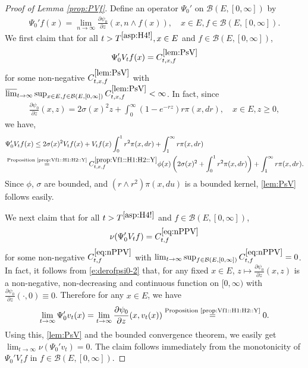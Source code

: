 \documentclass[12pt,a4paper]{amsart}
\numberwithin{equation}{section}
\theoremstyle{plain}
\theoremstyle{definition}
\theoremstyle{remark}
\begin{document}
\begin{proof}[Proof of Lemma \ref{prop:PVf}]
	Define an operator $\Psi_0'$ on $\mathcal B(E,[0,\infty])$ by
	\begin{align}
	\Psi_0' f(x)
	= \lim_{n\to \infty}\frac{\partial \psi_0}{ \partial z} (x, n\wedge f(x)),
	\quad x\in E, f\in \mathcal B(E,[0,\infty]).
	\end{align}
	We first claim that for all $t> T^{\eqref{asp:H4!}}, x\in E$ and $f\in \mathcal B(E,[0,\infty])$,
\begin{equation}
	\Psi_0'V_tf(x) = C^{\eqref{lem:PsV}}_{t,x,f} \label{lem:PsV}
\end{equation}
	for some non-negative $C^{\eqref{lem:PsV}}_{t,x,f}$ with $\varlimsup_{t\to \infty} \sup_{x\in E, f\in \mathcal B(E, [0,\infty])} C^{\eqref{lem:PsV}}_{t,x,f} <\infty$.
	In fact, since
\begin{align}\label{e:derofpsi0-2}
	\frac{\partial \psi_0 }{ \partial z} (x,z)
	= 2\sigma (x)^2 z + \int_0^\infty (1 - e^{- rz}) r \pi(x,dr),
	\quad x\in E, z\geq 0,
\end{align}
	we have,
\begin{align}
	&\Psi_0' V_tf(x)
	\leq 2\sigma (x)^2 V_t f(x) + V_t f(x) \int_0^1 r^2 \pi(x,dr) + \int_1^\infty r \pi(x,dr)
	\\&\overset{\text{Proposition \ref{prop:Vf1::H1:H2::Y}}}= C^{\ref{prop:Vf1::H1:H2::Y}}_{t,x,f} \phi(x) \left(2\sigma (x)^2 +\int_0^1 r^2 \pi(x,dr) \right)+ \int_1^\infty r \pi(x,dr).
\end{align}
	Since $\phi$, $\sigma$ are bounded,  and $(r\wedge r^2)\pi(x,du)$ is a bounded kernel, \eqref{lem:PsV} follows easily.
	
	We next claim that for all $t > T^{\eqref{asp:H4!}}$ and $f\in \mathcal B(E,[0,\infty])$,
\begin{equation}
	\nu(\Psi_0' V_t f) = C^{\eqref{eq:nPPV}}_{t,f} \label{eq:nPPV}
\end{equation}
	for some non-negative $C^{\eqref{eq:nPPV}}_{t,f}$ with $\lim_{t\to \infty}\sup_{f\in \mathcal B(E, [0,\infty])} C^{\eqref{eq:nPPV}}_{t,f} = 0$.
	In fact, it follows from \eqref{e:derofpsi0-2} that, for any fixed $x\in E$, $z\mapsto \frac{\partial \psi_0}{\partial z} (x,z)$ is a non-negative, non-decreasing and continuous function on $[0,\infty)$ with $\frac{\partial \psi_0}{\partial z} (\cdot,0) \equiv 0$.
	Therefore for any $x\in E$, we have
\[
	\lim_{t\to \infty} \Psi_0' v_t(x) =\lim_{t\to \infty} \frac{\partial \psi_0}{ \partial z}(x,v_t(x)) \overset{\text{Proposition \ref{prop:Vf1::H1:H2::Y}}}{=} 0.
\]
	Using this, \eqref{lem:PsV} and the bounded convergence theorem, we easily get $\lim_{t\to \infty}\nu(\Psi_0' v_t)  = 0. $ The claim follows immediately from the monotonicity of $\Psi_0' V_t f$ in $f\in \mathcal B(E,[0,\infty])$.
	

\end{proof}
\end{document}
